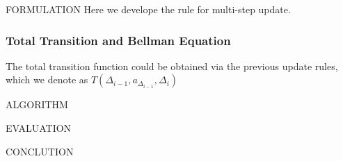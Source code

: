 \documentclass[10pt, conference, letterpaper]{IEEEtran}
\begin{document}
\begin{section}{FORMULATION}
            Here we develope the rule for multi-step update.

            \subsubsection{Total Transition and Bellman Equation}
            The total transition function could be obtained via the previous update rules, which we denote as $T(\Delta_{i-1}, a_{\Delta_{i-1}}, \Delta_{i})$

    \end{section}

    \begin{section}{ALGORITHM}
        \label{sec:algorithm}
    \end{section}

    \begin{section}{EVALUATION}
        \label{sec:ealuation}
    \end{section}

    \begin{section}{CONCLUTION}
        \label{sec:conclusion}
    \end{section}

    
    
\end{document}
